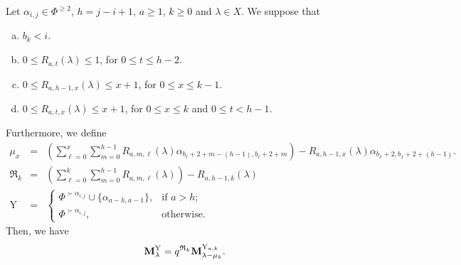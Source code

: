 \begin{lemma}\label{lem: fourth string lemma}  
Let  $\alpha_{i,j} \in \Phi^{\geq 2}$, $h=j-i+1$, $a\geq 1$, $k\geq 0$ and $\lambda \in X$.  
We suppose that
\begin{enumerate}[(a)]
\item $b_{k}< i$. \label{itemA4}  
\item $0\leq R_{a,t}(\lambda)\leq 1$, for $0\leq t \leq h-2$. \label{itemB4}
\item $ 0\leq R_{a,h-1,x}(\lambda) \leq x+1$, for $0\leq x\leq k-1$. \label{itemC4}
\item $0\leq R_{a,t,x}(\lambda) \leq x+1$, for $0\leq x\leq k$ and $0\leq t<h-1$.     \label{itemD4}
\end{enumerate}
Furthermore, we define 
\begin{equation}
    \begin{array}{rll}
        \mu_x & = & \displaystyle \left(  \sum_{\ell =0}^x \sum_{m=0}^{h-1} R_{a,m,\ell }(\lambda)\alpha_{b_{\ell }+2 +m -(h -1) ,b_{\ell}+2+m}\right)  - R_{a,h-1,x}  (\lambda)\alpha_{b_{x}+2,b_{x}+2+(h-1)}.  \\[15pt]
        \mathfrak{R} _{k} &= & \displaystyle\left (\sum_{\ell =0}^{k}\sum_{m=0}^{h-1} R_{a,m,\ell }(\lambda)\right) - R_{a,h-1,k}(\lambda)\\[15pt]
        \mathrm{Y} & = & \begin{cases}
            \Phi^{\succ \alpha_{i,j}}\cup \{\alpha_{a-h,a-1}\},&\text{if } a>h;\\
            \Phi^{\succ \alpha_{i,j}},&\text{otherwise}.
        \end{cases}
    \end{array}
\end{equation}
Then, we have 
\begin{equation}
    \mathbf{M}_{\lambda}^{\mathrm{Y}} = q^{\mathfrak{R}_k}\mathbf{M}_{\lambda - \mu_{k}}^{ \mathrm{Y}_{a,k}}.
\end{equation}
\end{lemma}


